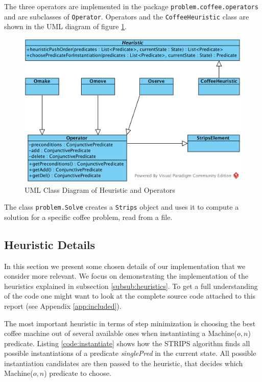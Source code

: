The three operators are implemented in the package \texttt{problem.coffee.operators} and are subclasses of \texttt{Operator}. Operators and the \texttt{CoffeeHeuristic} class are shown in the UML diagram of figure \ref{fig:uml3}.

\begin{figure}[!hbt]
  \includegraphics[width=1.1\textwidth]{uml/CD3}
  \caption{UML Class Diagram of Heuristic and Operators}
  \label{fig:uml3}
\end{figure}

The class \texttt{problem.Solve} creates a \texttt{Strips} object and uses it to compute a solution for a specific coffee problem, read from a file.

\subsection{Heuristic Details}

In this section we present some chosen details of our implementation that we consider more relevant. We focus on demonstrating the implementation of the heuristics explained in subsection \ref{subsub:heuristics}. To get a full understanding of the code one might want to look at the complete source code attached to this report (see Appendix \ref{app:included}).

The most important heuristic in terms of step minimization is choosing the best coffee machine out of several available ones when instantiating a Machine($o, n$) predicate. Listing \ref{code:instantiate} shows how the STRIPS algorithm finds all possible instantiations of a predicate \textit{singlePred} in the current state. All possible instantiation candidates are then passed to the heuristic, that decides which Machine($o, n$) predicate to choose. 

